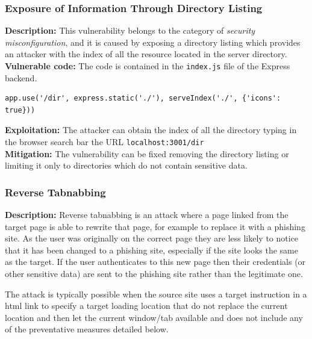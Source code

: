 \documentclass[]{article}
\begin{document}
\subsubsection{Exposure of Information Through Directory Listing}
\label{subsubsec:exposure_of_information_through_directory_listing}
\textbf{Description:} This vulnerability belongs to the category of \textit{security misconfiguration}, and it is caused by exposing a directory listing which
provides an attacker with the index of all the resource located in the server directory.
\\
\textbf{Vulnerable code:} The code is contained in the \texttt{index.js} file of the Express backend. 
\begin{lstlisting}
app.use('/dir', express.static('./'), serveIndex('./', {'icons': true}))
\end{lstlisting}
\textbf{Exploitation:} The attacker can obtain the index of all the directory typing in the browser search bar the URL \texttt{localhost:3001/dir}
\\ 
\textbf{Mitigation:} The vulnerability can be fixed removing the directory listing or limiting it only to directories which do not contain sensitive data.

\subsubsection{Reverse Tabnabbing}

\textbf{Description:} Reverse tabnabbing is an attack where a page linked from the target page is able to rewrite that page, for example to replace it with a phishing site. As the user was originally on the correct page they are less likely to notice that it has been changed to a phishing site, especially if the site looks the same as the target. If the user authenticates to this new page then their credentials (or other sensitive data) are sent to the phishing site rather than the legitimate one.

The attack is typically possible when the source site uses a target instruction in a html link to specify a target loading location that do not replace the current location and then let the current window/tab available and does not include any of the preventative measures detailed below.
\end{document}
